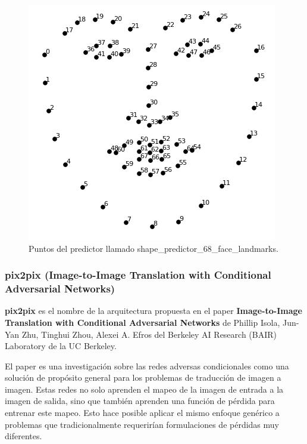 \documentclass[10pt,journal,compsoc]{IEEEtran}\usepackage[T1]{fontenc}                              %
\begin{document}
\begin{figure}
  \begin{center}
    \includegraphics[width=\linewidth]{./imgs/shape_predictor_68_face_landmarks.png}
    \caption{Puntos del predictor llamado shape\_predictor\_68\_face\_landmarks.}
  \end{center}
\end{figure}

\subsubsection{pix2pix (Image-to-Image Translation with Conditional Adversarial Networks)}

\textbf{pix2pix} es el nombre de la arquitectura propuesta en el paper
\textbf{Image-to-Image Translation with Conditional Adversarial
Networks} de Phillip Isola, Jun-Yan Zhu, Tinghui Zhou, Alexei A. Efros
del Berkeley AI Research (BAIR) Laboratory de la UC Berkeley.

El paper es una investigación sobre las redes adversas condicionales
como una solución de propósito general para los problemas de traducción
de imagen a imagen. Estas redes no solo aprenden el mapeo de la imagen
de entrada a la imagen de salida, sino que también aprenden una función
de pérdida para entrenar este mapeo. Esto hace posible aplicar el mismo
enfoque genérico a problemas que tradicionalmente requerirían
formulaciones de pérdidas muy diferentes.
\end{document}
